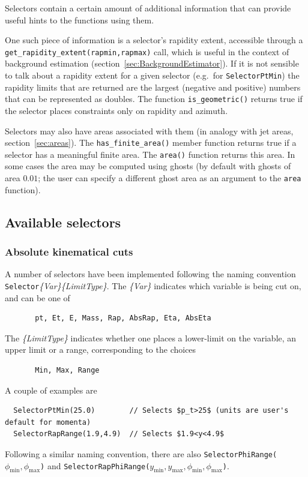 \documentclass[12pt,a4]{article}
\newcommand{\ttt}[1]{{\small\texttt{#1}}}
\begin{document}
Selectors contain a certain amount of additional information that can
provide useful hints to the functions using them.

One such piece of information is a selector's rapidity extent,
accessible through a \ttt{get\_rapidity\_extent(rapmin,rapmax)} call,
which is useful in the context of background estimation
(section~\ref{sec:BackgroundEstimator}).
%
If it is not sensible to talk about a rapidity extent for a given
selector (e.g.\ for \ttt{SelectorPtMin}) the rapidity limits that are
returned are the largest (negative and positive) numbers that can be
represented as doubles.
%
The function \ttt{is\_geometric()} returns true if the selector places
constraints only on rapidity and azimuth.

Selectors may also have areas associated with them (in analogy with
jet areas, section~\ref{sec:areas}).
%
The \ttt{has\_finite\_area()} member function returns true if a selector has a
meaningful finite area. The \ttt{area()} function returns this area.
%
In some cases the area may be computed using ghosts (by default with
ghosts of area $0.01$; the user can specify a different ghost area as
an argument to the \ttt{area} function).



\subsection{Available selectors}

\subsubsection{Absolute kinematical cuts}

A number of selectors have been implemented following the naming
convention \ttt{Selector}{\it\{Var\}\{LimitType\}}. 
%
The {\it\{Var\}} indicates which variable is being cut on, and can be
one of 
\begin{lstlisting}
       pt, Et, E, Mass, Rap, AbsRap, Eta, AbsEta
\end{lstlisting}
%
The {\it\{LimitType\}} indicates whether one places a lower-limit on
the variable, an upper limit or a range, corresponding to the choices
\begin{lstlisting}
       Min, Max, Range
\end{lstlisting}
%
A couple of examples are
\begin{lstlisting}
  SelectorPtMin(25.0)        // Selects $p_t>25$ (units are user's default for momenta)
  SelectorRapRange(1.9,4.9)  // Selects $1.9<y<4.9$
\end{lstlisting}
Following a similar naming convention, there are also
\ttt{SelectorPhiRange(}$\phi_{\min},\phi_{\max}$\ttt{)} and
\ttt{SelectorRapPhiRange(}$y_{\min},y_{\max},\phi_{\min},\phi_{\max}$\ttt{)}.
\end{document}
